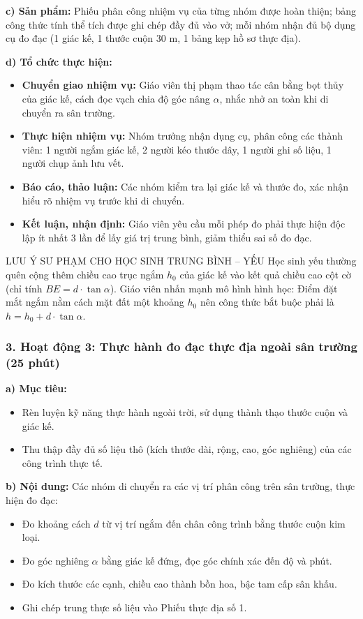 \documentclass[12pt, a4paper]{article}
\begin{document}
\noindent \textbf{c) Sản phẩm:}
Phiếu phân công nhiệm vụ của từng nhóm được hoàn thiện; bảng công thức tính thể tích được ghi chép đầy đủ vào vở; mỗi nhóm nhận đủ bộ dụng cụ đo đạc (1 giác kế, 1 thước cuộn $30\text{ m}$, 1 bảng kẹp hồ sơ thực địa).

\noindent \textbf{d) Tổ chức thực hiện:}
\begin{itemize}[leftmargin=0.6cm]
    \item \textbf{Chuyển giao nhiệm vụ:} Giáo viên thị phạm thao tác cân bằng bọt thủy của giác kế, cách đọc vạch chia độ góc nâng $\alpha$, nhắc nhở an toàn khi di chuyển ra sân trường.
    \item \textbf{Thực hiện nhiệm vụ:} Nhóm trưởng nhận dụng cụ, phân công các thành viên: 1 người ngắm giác kế, 2 người kéo thước dây, 1 người ghi số liệu, 1 người chụp ảnh lưu vết.
    \item \textbf{Báo cáo, thảo luận:} Các nhóm kiểm tra lại giác kế và thước đo, xác nhận hiểu rõ nhiệm vụ trước khi di chuyển.
    \item \textbf{Kết luận, nhận định:} Giáo viên yêu cầu mỗi phép đo phải thực hiện độc lập ít nhất 3 lần để lấy giá trị trung bình, giảm thiểu sai số đo đạc.
\end{itemize}

\begin{pedabox}{LƯU Ý SƯ PHẠM CHO HỌC SINH TRUNG BÌNH -- YẾU}
Học sinh yếu thường quên cộng thêm chiều cao trục ngắm $h_0$ của giác kế vào kết quả chiều cao cột cờ (chỉ tính $B E = d \cdot \tan\alpha$). Giáo viên nhấn mạnh mô hình hình học: Điểm đặt mắt ngắm nằm cách mặt đất một khoảng $h_0$ nên công thức bắt buộc phải là $h = h_0 + d \cdot \tan\alpha$.
\end{pedabox}

\subsubsection*{3. Hoạt động 3: Thực hành đo đạc thực địa ngoài sân trường (25 phút)}

\noindent \textbf{a) Mục tiêu:}
\begin{itemize}[leftmargin=0.6cm]
    \item Rèn luyện kỹ năng thực hành ngoài trời, sử dụng thành thạo thước cuộn và giác kế.
    \item Thu thập đầy đủ số liệu thô (kích thước dài, rộng, cao, góc nghiêng) của các công trình thực tế.
\end{itemize}

\noindent \textbf{b) Nội dung:}
Các nhóm di chuyển ra các vị trí phân công trên sân trường, thực hiện đo đạc:
\begin{itemize}[leftmargin=0.6cm]
    \item Đo khoảng cách $d$ từ vị trí ngắm đến chân công trình bằng thước cuộn kim loại.
    \item Đo góc nghiêng $\alpha$ bằng giác kế đứng, đọc góc chính xác đến độ và phút.
    \item Đo kích thước các cạnh, chiều cao thành bồn hoa, bậc tam cấp sân khấu.
    \item Ghi chép trung thực số liệu vào Phiếu thực địa số 1.
\end{itemize}
\end{document}
